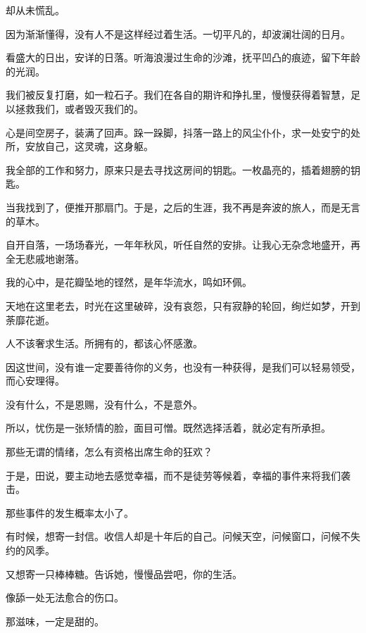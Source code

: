 		\vspace{1em}
		却从未慌乱。\par
		因为渐渐懂得，没有人不是这样经过着生活。一切平凡的，却波澜壮阔的日月。\par
		看盛大的日出，安详的日落。听海浪漫过生命的沙滩，抚平凹凸的痕迹，留下年龄的光润。\par
		我们被反复打磨，如一粒石子。我们在各自的期许和挣扎里，慢慢获得着智慧，足以拯救我们，或者毁灭我们的。

		\vspace{1em}
		心是间空房子，装满了回声。跺一跺脚，抖落一路上的风尘仆仆，求一处安宁的处所，安放自己，这灵魂，这身躯。\par
		我全部的工作和努力，原来只是去寻找这房间的钥匙。一枚晶亮的，插着翅膀的钥匙。\par
		当我找到了，便推开那扇门。于是，之后的生涯，我不再是奔波的旅人，而是无言的草木。\par
		自开自落，一场场春光，一年年秋风，听任自然的安排。让我心无杂念地盛开，再全无悲戚地谢落。\par
		我的心中，是花瓣坠地的铿然，是年华流水，鸣如环佩。\par
		天地在这里老去，时光在这里破碎，没有哀怨，只有寂静的轮回，绚烂如梦，开到荼靡花逝。

		\vspace{1em}
		人不该奢求生活。所拥有的，都该心怀感激。\par
		因这世间，没有谁一定要善待你的义务，也没有一种获得，是我们可以轻易领受，而心安理得。\par
		没有什么，不是恩赐，没有什么，不是意外。\par
		所以，忧伤是一张矫情的脸，面目可憎。既然选择活着，就必定有所承担。\par
		那些无谓的情绪，怎么有资格出席生命的狂欢？

		\vspace{1em}
		于是，田说，要主动地去感觉幸福，而不是徒劳等候着，幸福的事件来将我们袭击。\par
		那些事件的发生概率太小了。

		有时候，想寄一封信。收信人却是十年后的自己。问候天空，问候窗口，问候不失约的风季。

		又想寄一只棒棒糖。告诉她，慢慢品尝吧，你的生活。\par
		像舔一处无法愈合的伤口。

		那滋味，一定是甜的。

	\endwriting



